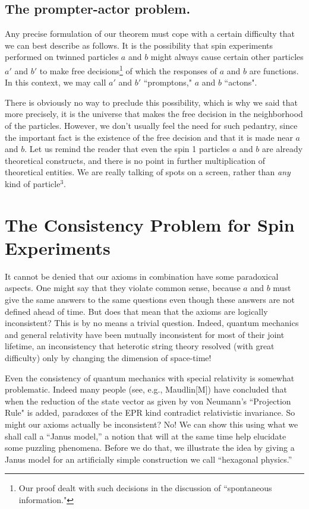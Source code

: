\documentclass[12pt]{amsart}
\begin{document}
\subsection {The prompter-actor problem.}

Any precise formulation of our theorem must cope with a certain difficulty 
that we can best describe as follows.  It is the possibility that spin experiments 
performed on twinned particles $a$ and $b$ might always cause certain other 
particles $a'$ and $b'$ to make free decisions\footnote{Our proof dealt with such decisions in the discussion of ``spontaneous information."} of which the responses of $a$ and $b$ are functions. In this context, we may call $a'$ and $b'$ ``promptons," $a$ and $b$ ``actons".  

There is obviously no way to preclude this possibility, which is why we said
that more precisely, it is the universe that makes the free decision in the
neighborhood of the particles. However, we don't usually feel the need for
such pedantry, since the important fact is the existence of the free decision
and that it is made near $a$ and $b$. Let us remind the reader that even the
spin 1 particles $a$ and $b$ are already theoretical constructs, and there is
no point in further multiplication of theoretical entities.  We are really 
talking of spots on a screen, rather than \textit{any} kind of particle$^3$.   

\section{The Consistency Problem for Spin Experiments}%

  It cannot be denied that our axioms in combination have some paradoxical aspects.  
One might say that they violate common sense, because $a$ and $b$ must give the same
answers to the same questions even though these answers are not defined ahead of time.  But does that mean that the axioms are logically inconsistent?  This is by no means a trivial question. Indeed, quantum mechanics and general relativity have been mutually inconsistent for most of their joint lifetime, an inconsistency that heterotic string theory resolved (with great difficulty) only by changing the dimension of space-time!
  
   Even the consistency of quantum mechanics with special relativity is somewhat
problematic. Indeed many people (see, e.g., Maudlin[M]) have concluded that when the reduction of the state vector as given by von Neumann's ``Projection Rule" 
is added, paradoxes of the EPR kind contradict relativistic invariance.  So might
our axioms actually be inconsistent?    No!  We can show this using what we shall call a
``Janus model,'' a notion that will at the same time help elucidate some puzzling phenomena. Before we do that, we illustrate the idea by giving a Janus model for an artificially simple construction we call ``hexagonal physics.''
\end{document}

